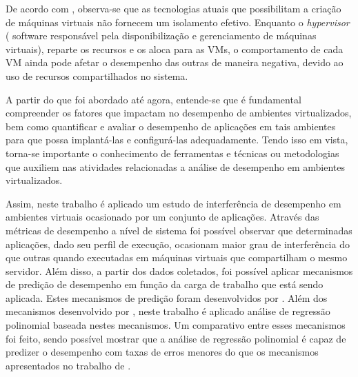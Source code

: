 \documentclass[[10pt,journal]{IEEEtran}
\begin{document}
De acordo com \cite{koh2007}, observa-se que as tecnologias atuais que possibilitam a criação de máquinas virtuais não fornecem um isolamento efetivo. Enquanto o \textit{hypervisor} ( software responsável pela disponibilização e gerenciamento de máquinas virtuais), reparte os recursos e os aloca para as VMs, o comportamento de cada VM ainda pode afetar o desempenho das outras de maneira negativa, devido ao uso de recursos compartilhados no sistema.

A partir do que foi abordado até agora, entende-se que é fundamental compreender os fatores que impactam no desempenho de ambientes virtualizados, bem como quantificar e avaliar o desempenho de aplicações em tais ambientes para que possa implantá-las e configurá-las adequadamente. Tendo isso em vista, torna-se importante o conhecimento de ferramentas e técnicas ou metodologias que auxiliem nas atividades relacionadas a análise de desempenho em ambientes virtualizados. 

Assim, neste trabalho é aplicado um estudo de interferência de desempenho em ambientes virtuais ocasionado por um conjunto de aplicações. Através das métricas de desempenho a nível de sistema foi possível observar que determinadas aplicações, dado seu perfil de execução, ocasionam maior grau de interferência do que outras quando executadas em máquinas virtuais que compartilham o mesmo servidor. Além disso, a partir dos dados coletados, foi possível aplicar mecanismos de predição de desempenho em função da carga de trabalho que está sendo aplicada. Estes mecanismos de predição foram desenvolvidos por \cite{koh2007}. Além dos mecanismos desenvolvido por \cite{koh2007}, neste trabalho é aplicado análise de regressão polinomial baseada nestes mecanismos. Um comparativo entre esses mecanismos foi feito, sendo possível mostrar que a análise de regressão polinomial é capaz de predizer o desempenho com taxas de erros menores do que os mecanismos apresentados no trabalho de \cite{koh2007}. 
 

\end{document}
